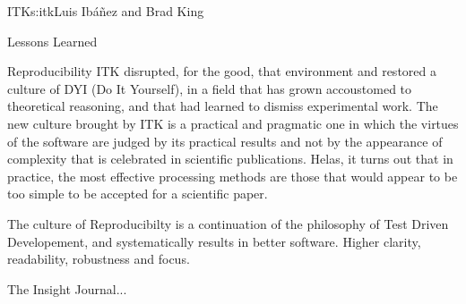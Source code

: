 \begin{aosachapter}{ITK}{s:itk}{Luis Ib\'{a}\~{n}ez and Brad King}
\begin{aosasect1}{Lessons Learned}
\begin{aosasect2}{Reproducibility}
ITK disrupted, for the good, that environment and restored a culture of DYI (Do
It Yourself), in a field that has grown accoustomed to theoretical reasoning,
and that had learned to dismiss experimental work. The new culture brought by
ITK is a practical and pragmatic one in which the virtues of the software are
judged by its practical results and not by the appearance of complexity that is
celebrated in scientific publications. Helas, it turns out that in practice,
the most effective processing methods are those that would appear to be too
simple to be accepted for a scientific paper.

The culture of Reproducibilty is a continuation of the philosophy of Test
Driven Developement, and systematically results in better software. Higher
clarity, readability, robustness and focus.

The Insight Journal...
\end{aosasect2}

\end{aosasect1}

\end{aosachapter}
